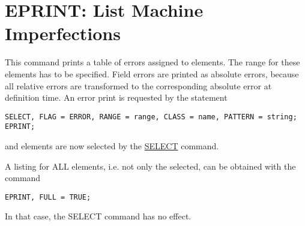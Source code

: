 
\section{EPRINT: List Machine Imperfections}  
This command prints a table of errors assigned to elements. The range
for these elements has to be specified. Field errors are printed as
absolute errors, because all relative errors are transformed to the
corresponding absolute error at definition time. An error print is
requested by the statement  

\begin{verbatim}
SELECT, FLAG = ERROR, RANGE = range, CLASS = name, PATTERN = string;
EPRINT;
\end{verbatim}

and elements are now selected by the \href{../Introduction/select.html}{SELECT} command. 


A listing for ALL elements, i.e. not only the selected, can be obtained with the command 
\begin{verbatim}
EPRINT, FULL = TRUE;
\end{verbatim} 
In that case, the SELECT command has no effect.

